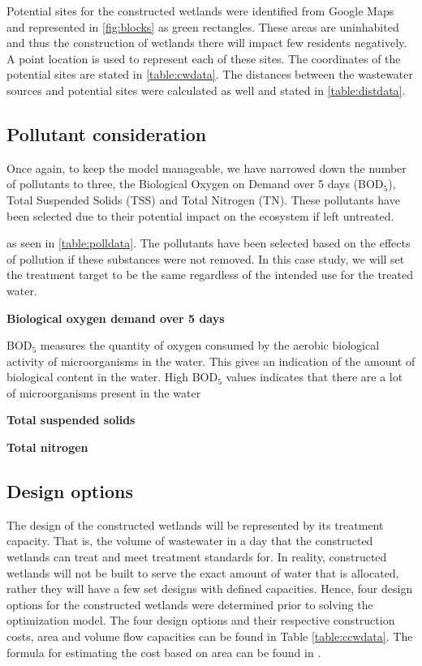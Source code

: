 \documentclass[preprint,12pt,authoryear]{elsarticle}
\begin{document}
Potential sites for the constructed wetlands were identified from Google Maps and represented in \autoref{fig:blocks} as green rectangles. These areas are uninhabited and thus the construction of wetlands there will impact few residents negatively. A point location is used to represent each of these sites. The coordinates of the potential sites are stated in \autoref{table:cwdata}. The distances between the wastewater sources and potential sites were calculated as well and stated in \autoref{table:distdata}. 

\subsection{Pollutant consideration} 
Once again, to keep the model manageable, we have narrowed down the number of pollutants to three, the Biological Oxygen on Demand over 5 days (BOD$_5$), Total Suspended Solids (TSS) and Total Nitrogen (TN). These pollutants have been selected due to their potential impact on the ecosystem if left untreated. 

 as seen in \autoref{table:polldata}. The pollutants have been selected based on the effects of pollution if these substances were not removed. In this case study, we will set the treatment target to be the same regardless of the intended use for the treated water.

\noindent\textbf{Biological oxygen demand over 5 days}

BOD$_5$ measures the quantity of oxygen consumed by the aerobic biological activity of microorganisms in the water. This gives an indication of the amount of biological content in the water. High BOD$_5$ values indicates that there are a lot of microorganisms present in the water 

\noindent\textbf{Total suspended solids}

\noindent\textbf{Total nitrogen}



\subsection{Design options} 
The design of the constructed wetlands will be represented by its treatment capacity. That is, the volume of wastewater in a day that the constructed wetlands can treat and meet treatment standards for. In reality, constructed wetlands will not be built to serve the exact amount of water that is allocated, rather they will have a few set designs with defined capacities. Hence, four design options for the constructed wetlands were determined prior to solving the optimization model. The four design options and their respective construction costs, area and volume flow capacities can be found in Table \ref{table:ccwdata}. The formula for estimating the cost based on area can be found in \cite{kadlec2009}.
\end{document}
